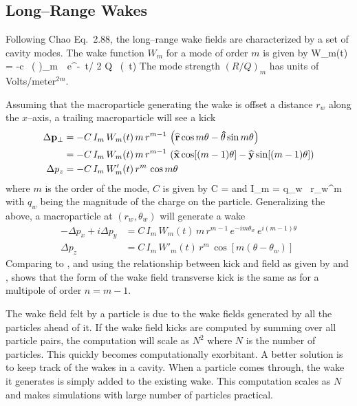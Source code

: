 \subsection{Long--Range Wakes}

Following Chao\cite{b:chao} Eq.~2.88, the long--range wake fields are
characterized by a set of cavity modes. The wake function $W_m$ for a
mode of order $m$ is given by
\Begineq
  W_m(t) = -c \, \left(  \right)_m \,\,
  e^{-\omega \, t/ 2 Q} \, \sin (\omega \, t)
  \label{wcrq}
\Endeq
The mode strength $(R/Q)_m$ has units of Volts/meter$^{2m}$.

Assuming that the macroparticle generating the wake is offset a
distance $r_w$ along the $x$--axis, a trailing macroparticle will see a kick
\begin{align}
  \Delta {{\bf p}}_\perp &= 
    -C \, I_m \, W_m(t) \, m \, r^{m-1} \, \left( 
    {\widehat{\bf r}} \cos m\theta - {\bf\hat\theta} \sin m\theta \right) \\
  &= -C \, I_m \, W_m(t) \, m \, r^{m-1} \, \left( 
    {\widehat{\bf x}} \cos [(m-1) \theta] - 
    {\widehat{\bf y}} \sin [(m-1)\theta] \right) \nonumber \\
  \Delta p_z &= -C \, I_m \, W'_m(t) \, r^m \, \cos m\theta
\end{align}
where $m$ is the order of the mode, $C$ is given by
\Begineq
  C = 
\Endeq
 and
\Begineq
  I_m = q_w \, r_w^m
\Endeq
with $q_w$ being the magnitude of the charge on the particle. 
Generalizing the above, a macroparticle at $(r_w, \theta_w)$ will generate a wake
\begin{align}
  -\Delta p_x + i\Delta p_y &= C \, I_m \, W_m(t) \, 
    m \, r^{m-1} \, e^{-i m \theta_w} \, e^{i (m-1) \theta} 
    \label{ppcimr} \\
  \Delta p_z &= C \, I_m \, W'_m(t) \, r^m \, \cos [m(\theta - \theta_w)]
    \label{pciwr}
\end{align}
Comparing  to , and using the relationship between
kick and field as given by  and , shows that
the form of the wake field transverse kick is the same as for a
multipole of order $n = m - 1$. 

The wake field felt by a particle is due to the wake fields generated by
all the particles ahead of it. If the wake field kicks are computed by
summing over all particle pairs, the
computation will scale as $N^2$ where $N$ is the number of
particles. This quickly becomes computationally exorbitant. A better
solution is to keep track of the wakes in a cavity. When a particle
comes through, the wake it generates is simply added to the existing
wake. This computation scales as $N$ and makes simulations with large
number of particles practical. 

